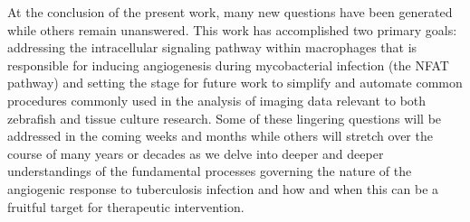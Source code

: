 



%
%

At the conclusion of the present work, many new questions have been generated while others remain unanswered. This work has accomplished two primary goals: addressing the intracellular signaling pathway within macrophages that is responsible for inducing angiogenesis during mycobacterial infection (the NFAT pathway) and setting the stage for future work to simplify and automate common procedures commonly used in the analysis of imaging data relevant to both zebrafish and tissue culture research. Some of these lingering questions will be addressed in the coming weeks and months while others will stretch over the course of many years or decades as we delve into deeper and deeper understandings of the fundamental processes governing the nature of the angiogenic response to tuberculosis infection and how and when this can be a fruitful target for therapeutic intervention. 

